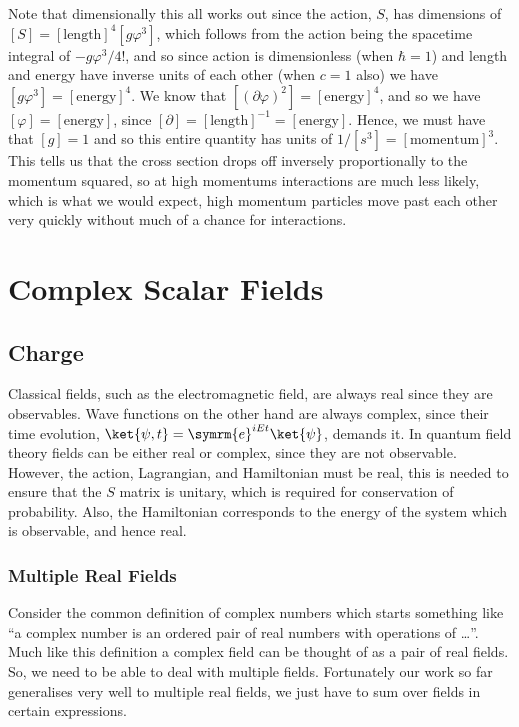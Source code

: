 \documentclass[fleqn]{NotesClass}
\newcommand{\e}{\symrm{e}}
\begin{document}
    Note that dimensionally this all works out since the action, \(S\), has dimensions of \([S] = [\text{length}]^4[g\varphi^3]\), which follows from the action being the spacetime integral of \(-g\varphi^3/4!\), and so since action is dimensionless (when \(\hbar = 1\)) and length and energy have inverse units of each other (when \(c = 1\) also) we have \([g\varphi^3] = [\text{energy}]^4\).
    We know that \([(\partial \varphi)^2] = [\text{energy}]^4\), and so we have \([\varphi] = [\text{energy}]\), since \([\partial] = [\text{length}]^{-1} = [\text{energy}]\).
    Hence, we must have that \([g] = 1\) and so this entire quantity has units of \(1/[s^3] = [\text{momentum}]^3\).
    This tells us that the cross section drops off inversely proportionally to the momentum squared, so at high momentums interactions are much less likely, which is what we would expect, high momentum particles move past each other very quickly without much of a chance for interactions.
    
    \part{Complex Scalar Fields}
    \chapter{Charge}
    Classical fields, such as the electromagnetic field, are always real since they are observables.
    Wave functions on the other hand are always complex, since their time evolution, \(\ket{\psi, t} = \e^{iEt}\ket{\psi}\), demands it.
    In quantum field theory fields can be either real or complex, since they are not observable.
    However, the action, Lagrangian, and Hamiltonian must be real, this is needed to ensure that the \(S\) matrix is unitary, which is required for conservation of probability.
    Also, the Hamiltonian corresponds to the energy of the system which is observable, and hence real.
    
    \section{Multiple Real Fields}
    Consider the common definition of complex numbers which starts something like \enquote{a complex number is an ordered pair of real numbers with operations of \dots}.
    Much like this definition a complex field can be thought of as a pair of real fields.
    So, we need to be able to deal with multiple fields.
    Fortunately our work so far generalises very well to multiple real fields, we just have to sum over fields in certain expressions.
    
\end{document}
